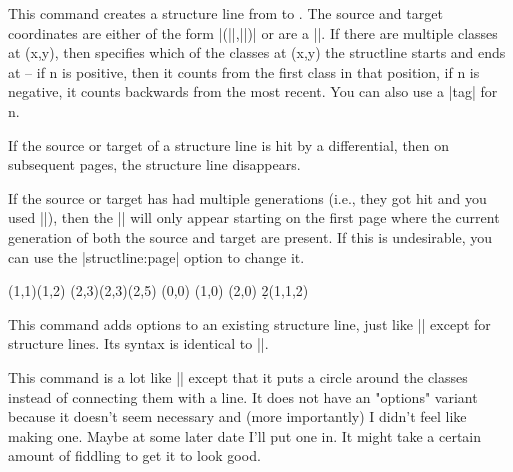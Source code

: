 \documentclass{ltxdoc}
\begin{document}
\begin{sseqdata}[name=ex1,degree={#1}{1-#1}]
\begin{command}{\structline{}}
This command creates a structure line from  to . The source and target coordinates are either of the form |(||,||)| or are a ||. If there are multiple classes at (x,y), then  specifies which of the classes at (x,y) the structline starts and ends at -- if n is positive, then it counts from the first class in that position, if n is negative, it counts backwards from the most recent. You can also use a |tag| for n.

If the source or target of a structure line is hit by a differential, then on subsequent pages, the structure line disappears.

If the source or target has had multiple generations (i.e., they got hit and you used |\replaceclass|), then the |\structline| will only appear starting on the first page where the current generation of both the source and target are present. If this is undesirable, you can use the |structline:page| option to change it.
\begin{codeexample}[width=9cm]
\sseqnewgroup*{}
\begin{sseqdata}[name=structline example,
                 classes={circle,fill},
                 Adams grading, no axes]
\class(1,1)\class(1,2)
\class(2,3)\class(2,3)\class(2,5)
\tower[classes=blue](0,0)
\tower[struct lines=dashed,orange](1,0)
\tower[struct lines=red](2,0)
\d2(1,1,2)
\end{sseqdata}
\printpage[name=structline example,page=2]
\hskip1cm
\printpage[name=structline example,page=3]
\end{codeexample}
\end{command}

\begin{command}{}
This command adds options to an existing structure line, just like |\classoptions| except for structure lines. Its syntax is identical to |\structline|.
\end{command}

\begin{command}{\circleclasses{}}
This command is a lot like |\structline| except that it puts a circle around the classes instead of connecting them with a line. It does not have an "options" variant because it doesn't seem necessary and (more importantly) I didn't feel like making one. Maybe at some later date I'll put one in. It might take a certain amount of fiddling to get it to look good.
\end{command}


\end{sseqdata}
\end{document}
